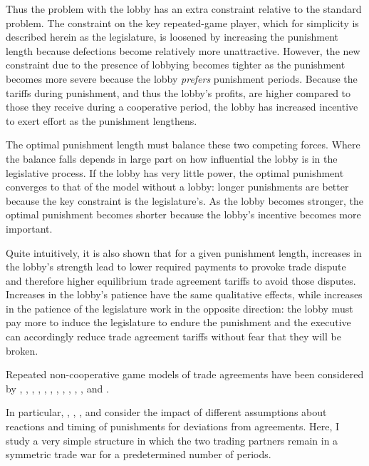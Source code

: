 \documentclass[authoryear, review]{elsarticle}
\begin{document}
Thus the problem with the lobby has an extra constraint relative to the standard problem. The constraint on the key repeated-game player, which for simplicity is described herein as the legislature, is loosened by increasing the punishment length because defections become relatively more unattractive. However, the new constraint due to the presence of lobbying becomes tighter as the punishment becomes more severe because the lobby \textit{prefers} punishment periods. Because the tariffs during punishment, and thus the lobby's profits, are higher compared to those they receive during a cooperative period, the lobby has increased incentive to exert effort as the punishment lengthens.

The optimal punishment length must balance these two competing forces. Where the balance falls depends in large part on how influential the lobby is in the legislative process. If the lobby has very little power, the optimal punishment converges to that of the model without a lobby: longer punishments are better because the key constraint is the legislature's. As the lobby becomes stronger, the optimal punishment becomes shorter because the lobby's incentive becomes more important.

Quite intuitively, it is also shown that for a given punishment length, increases in the lobby's strength lead to lower required payments to provoke trade dispute and therefore higher equilibrium trade agreement tariffs to avoid those disputes. Increases in the lobby's patience have the same qualitative effects, while increases in the patience of the legislature work in the opposite direction: the lobby must pay more to induce the legislature to endure the punishment and the executive can accordingly reduce trade agreement tariffs without fear that they will be broken.

Repeated non-cooperative game models of trade agreements have been considered by \citet{mcm86,mcm89}, \citet{cotmitch}, \citet{dixit1987}, \citet{bs1990, bs1997a, bs1997b, bs2002}, \citet{kovthurs}, \citet{maggi99}, \citet{ederington}, \citet{ludema2001}, \citet{rosendorff}, \citet{krw}, \citet{bagwell2009}, and \citet{park}.

In particular, \citet{hungerford}, \citet{riezman1991}, \citet{cotmitch}, \citet{bagwell2008} and \citet{martinvergote} consider the impact of different assumptions about reactions and timing of punishments for deviations from agreements. Here, I study a very simple structure in which the two trading partners remain in a symmetric trade war for a predetermined number of periods.
\end{document}
